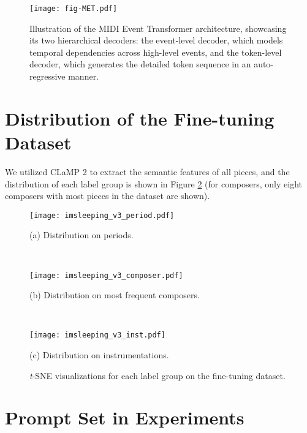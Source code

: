 \begin{figure}[t] %
\centering
\texttt{[image: fig-MET.pdf]} %
\caption{Illustration of the MIDI Event Transformer architecture, showcasing its two hierarchical decoders: the event-level decoder, which models temporal dependencies across high-level events, and the token-level decoder, which generates the detailed token sequence in an auto-regressive manner.}
\label{fig:example}
\end{figure}

\newpage

\section{Distribution of the Fine-tuning Dataset}

We utilized CLaMP 2 to extract the semantic features of all pieces, and the distribution of each label group is shown in Figure \ref{fig:Figure 3} (for composers, only eight composers with most pieces in the dataset are shown).



\begin{figure}[!b]
    \centering
    \begin{minipage}{0.41\textwidth}
        \centering
        \texttt{[image: imsleeping\_v3\_period.pdf]}
        \caption*{(a) Distribution on periods.}
    \end{minipage} \\[0.5em]
    \begin{minipage}{0.41\textwidth}
        \centering
        \texttt{[image: imsleeping\_v3\_composer.pdf]}
        \caption*{(b) Distribution on most frequent composers.}
    \end{minipage} \\[0.5em]
    \begin{minipage}{0.41\textwidth}
        \centering
        \texttt{[image: imsleeping\_v3\_inst.pdf]}
        \caption*{(c) Distribution on instrumentations.}
    \end{minipage}
    \caption{\textit{t}-SNE visualizations for each label group on the fine-tuning dataset.}
    \label{fig:Figure 3}
\end{figure}




\section{Prompt Set in Experiments}

